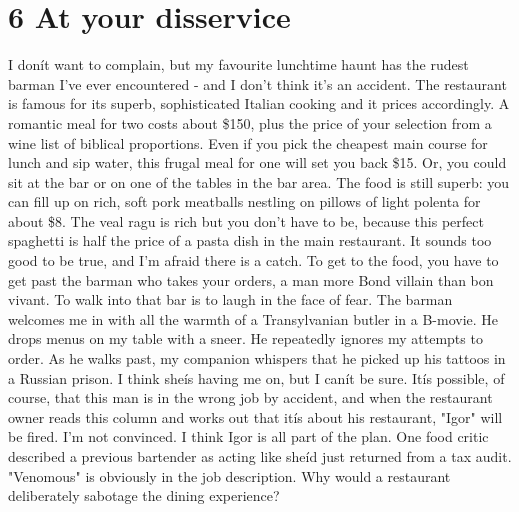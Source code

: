 \documentclass[a4paper]{article}
\begin{document}
		\section*{6 At your disservice}
		
		I donít want to complain, but my favourite lunchtime haunt has the rudest barman I've
		ever encountered - and I don't think it's an accident. The restaurant is famous for its
		superb, sophisticated Italian cooking and it prices accordingly. A romantic meal for two
		costs about \$150, plus the price of your selection from a wine list of biblical proportions.
		Even if you pick the cheapest main course for lunch and sip water, this frugal meal for
		one will set you back \$15.
		Or, you could sit at the bar or on one of the tables in the bar area. The food is still
		superb: you can fill up on rich, soft pork meatballs nestling on pillows of light polenta for
		about \$8. The veal ragu is rich but you don't have to be, because this perfect spaghetti
		is half the price of a pasta dish in the main restaurant.
		It sounds too good to be true, and I'm afraid there is a catch. To get to the food,
		you have to get past the barman who takes your orders, a man more Bond villain than
		bon vivant. To walk into that bar is to laugh in the face of fear. The barman welcomes
		me in with all the warmth of a Transylvanian butler in a B-movie. He drops menus on
		my table with a sneer. He repeatedly ignores my attempts to order. As he walks past,
		my companion whispers that he picked up his tattoos in a Russian prison. I think sheís
		having me on, but I canít be sure.
		Itís possible, of course, that this man is in the wrong job by accident, and when
		the restaurant owner reads this column and works out that itís about his restaurant,
		"Igor" will be fired. I'm not convinced. I think Igor is all part of the plan. One food
		critic described a previous bartender as acting like sheíd just returned from a tax audit.
		"Venomous" is obviously in the job description.
		Why would a restaurant deliberately sabotage the dining experience?
\end{document}
